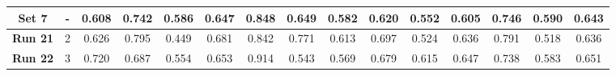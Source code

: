 \begin{table}[!ht]
{\begin{tabular}{|c|c|ccc|ccc|ccc|c|c|c|c|}
			
			\hline
			
			\textbf{Set 7} & - & \multicolumn{1}{c|}{0.608} & \multicolumn{1}{c|}{0.742} & 0.586 & \multicolumn{1}{c|}{0.647} & \multicolumn{1}{c|}{0.848} & 0.649 & \multicolumn{1}{c|}{0.582} & \multicolumn{1}{c|}{0.620} & 0.552 & 0.605 & 0.746 & 0.590 & 0.643 \\

			\hline
			\hline
			
			\textbf{Run 21} & 2 & \multicolumn{1}{c|}{0.626} & \multicolumn{1}{c|}{0.795} & 0.449 & \multicolumn{1}{c|}{0.681} & \multicolumn{1}{c|}{0.842} & 0.771 & \multicolumn{1}{c|}{0.613} & \multicolumn{1}{c|}{0.697} & 0.524 & 0.636 & 0.791 & 0.518 & 0.636 \\
			
			
			\textbf{Run 22} & 3 & \multicolumn{1}{c|}{0.720} & \multicolumn{1}{c|}{0.687} & 0.554 & \multicolumn{1}{c|}{0.653} & \multicolumn{1}{c|}{0.914} & 0.543 & \multicolumn{1}{c|}{0.569} & \multicolumn{1}{c|}{0.679} & 0.615 & 0.647 & 0.738 & 0.583 & 0.651 \\
			
			
			\hline
			
	\end{tabular}}
	\label{tab:Experiment1.3SevenPatches5DegreeRotationFluid}
\end{table}

